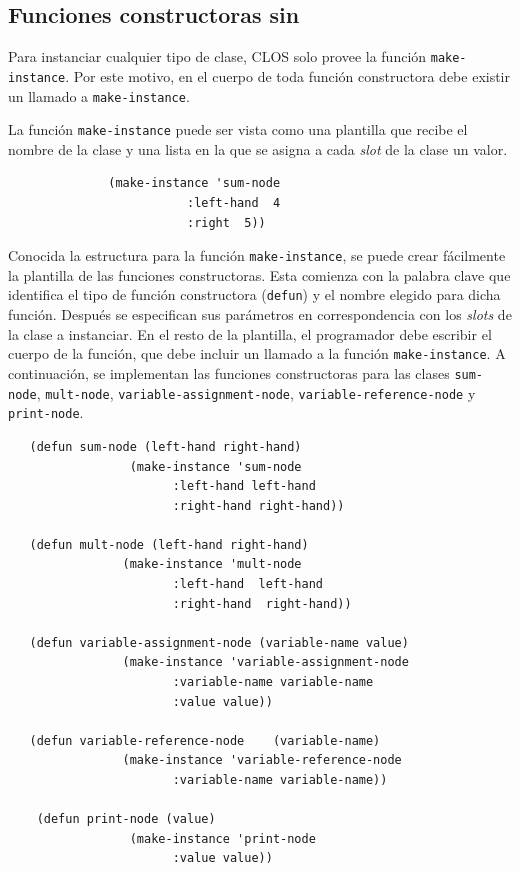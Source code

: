 \subsection{Funciones constructoras sin \gagm}
\label{sec:patron en funcion}
Para instanciar cualquier tipo de clase, CLOS solo provee la función \texttt{make-instance}. Por este motivo, en el cuerpo de toda función constructora debe existir un llamado a \texttt{make-instance}.

La función \texttt{make-instance} puede ser vista como una plantilla que recibe el nombre de la clase y una lista en la que se asigna a cada \textit{slot} de la clase un valor.   
\begin{verbatim}
              (make-instance 'sum-node 
                         :left-hand  4
                         :right  5))
\end{verbatim}

Conocida la estructura para la función \texttt{make-instance}, se puede crear fácilmente la plantilla de las funciones constructoras. Esta comienza con la palabra clave que identifica el tipo de función constructora (\texttt{defun}) y el nombre elegido para dicha función. Después se especifican sus parámetros en correspondencia con los \textit{slots} de la clase a instanciar. En el resto de la plantilla, el programador debe escribir el cuerpo de la función, que debe incluir un llamado a la función \texttt{make-instance}. A continuación, se implementan las funciones constructoras para las clases \texttt{sum-node}, \texttt{mult-node}, \texttt{variable-assignment-node}, \texttt{variable-reference-node} y \texttt{print-node}.  
\begin{verbatim}
   (defun sum-node (left-hand right-hand)
                 (make-instance 'sum-node 
                       :left-hand left-hand
                       :right-hand right-hand))
          	
   (defun mult-node (left-hand right-hand)
          	    (make-instance 'mult-node 
          	           :left-hand  left-hand
          	           :right-hand  right-hand))	
          
   (defun variable-assignment-node (variable-name value)
          	    (make-instance 'variable-assignment-node
          	           :variable-name variable-name
          	           :value value))
          	                                     
   (defun variable-reference-node	 (variable-name)
          	    (make-instance 'variable-reference-node	
          	           :variable-name variable-name))
          	                                               	                                     
    (defun print-node (value)
          	     (make-instance 'print-node	
          	           :value value))   	                    			        
\end{verbatim}

